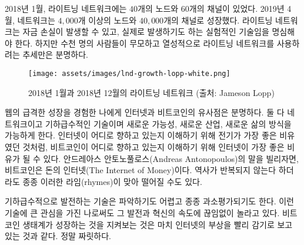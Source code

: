 \begin{comment}
	In January 2018, the lightning network had $40$ nodes and $60$
	channels~\cite{web:lightning-nodes}. In April 2019, the network grew to more
	than $4000$ nodes and around $40.000$ channels. Keep in mind that this is still
	experimental technology where loss of funds can and does occur. Yet the trend is
	clear: thousands of people are reckless and eager to use it.
\end{comment}
2018년 1월, 라이트닝 네트워크에는 $40$개의 노드와 $60$개의 채널이 있었다.\cite{web:lightning-nodes}
2019년 4월, 네트워크는 $4,000$개 이상의 노드와  $40,000$개의 채널로 성장했다.
라이트닝 네트워크는 자금 손실이 발생할 수 있고, 실제로 발생하기도 하는 실험적인 기술임을 명심해야 한다.
하지만 수천 명의 사람들이 무모하고 열성적으로 라이트닝 네트워크를 사용하려는 추세만은 분명하다. 

\begin{figure}
	\texttt{[image: assets/images/lnd-growth-lopp-white.png]}
	\caption{2018년 1월과 2018년 12월의 라이트닝 네트워크 (출처: Jameson Lopp)}
	\label{fig:lnd-growth-lopp-white.png}
\end{figure}

\begin{comment}
	To me, having lived through the meteoric rise of the web, the parallels
	between the internet and Bitcoin are obvious. Both are networks, both
	are exponential technologies, and both enable new possibilities, new
	industries, new ways of life. Just like electricity was the best
	metaphor to understand where the internet is heading, the internet might
	be the best metaphor to understand where bitcoin is heading. Or, in the
	words of Andreas Antonopoulos, Bitcoin is \textit{The Internet of Money}.
	These metaphors are a great reminder that while history doesn't repeat
	itself, it often rhymes.
\end{comment}
웹의 급격한 성장을 경험한 나에게 인터넷과 비트코인의 유사점은 분명하다.
둘 다 네트워크이고 기하급수적인 기술이며 새로운 가능성, 새로운 산업, 새로운 삶의 방식을 가능하게 한다.
인터넷이 어디로 향하고 있는지 이해하기 위해 전기가 가장 좋은 비유였던 것처럼,
비트코인이 어디로 향하고 있는지 이해하기 위해 인터넷이 가장 좋은 비유가 될 수 있다.
안드레아스 안토노풀로스(Andreas Antonopoulos)의 말을 빌리자면, 비트코인은 돈의 인터넷(The Internet of Money)이다.
역사가 반복되지 않는다 하더라도 종종 이러한 라임(rhymes)이 맞아 떨어질 수도 있다.

\begin{comment}
	Exponential technologies are hard to grasp and often underestimated.
	Even though I have a great interest in such technologies, I am
	constantly surprised by the pace of progress and innovation. Watching
	the Bitcoin ecosystem grow is like watching the rise of the internet in
	fast-forward. It is exhilarating.
\end{comment}
기하급수적으로 발전하는 기술은 파악하기도 어렵고 종종 과소평가되기도 한다.
이런 기술에 큰 관심을 가진 나로써도 그 발전과 혁신의 속도에 끊임없이 놀라고 있다.
비트코인 생태계가 성장하는 것을 지켜보는 것은 마치 인터넷의 부상을 빨리 감기로 보고 있는 것과 같다.
정말 짜릿하다.

